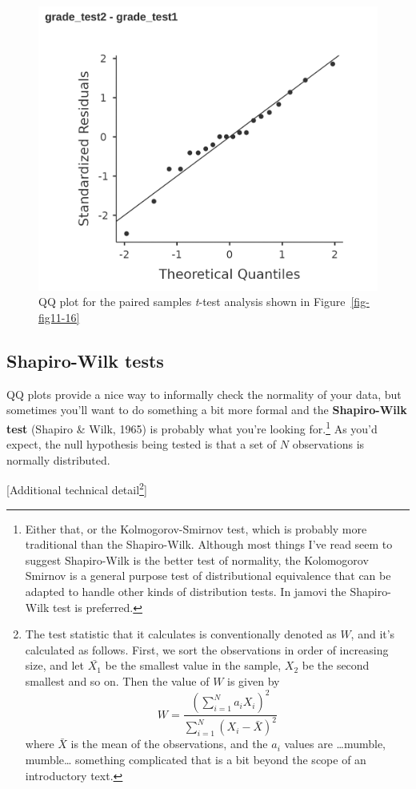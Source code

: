 \documentclass[
  a4paper,
]{book}
\begin{document}
\begin{figure}

\includegraphics[width=1\textwidth,height=\textheight]{images/fig11-23.png} \hfill{}

\caption{\label{fig-fig11-23}QQ plot for the paired samples
\emph{t}-test analysis shown in Figure~\ref{fig-fig11-16}}

\end{figure}

\hypertarget{shapiro-wilk-tests}{%
\subsection{Shapiro-Wilk tests}\label{shapiro-wilk-tests}}

QQ plots provide a nice way to informally check the normality of your
data, but sometimes you'll want to do something a bit more formal and
the \textbf{Shapiro-Wilk test} (Shapiro \& Wilk, 1965) is probably what
you're looking for.\footnote{Either that, or the Kolmogorov-Smirnov
  test, which is probably more traditional than the Shapiro-Wilk.
  Although most things I've read seem to suggest Shapiro-Wilk is the
  better test of normality, the Kolomogorov Smirnov is a general purpose
  test of distributional equivalence that can be adapted to handle other
  kinds of distribution tests. In jamovi the Shapiro-Wilk test is
  preferred.} As you'd expect, the null hypothesis being tested is that
a set of \(N\) observations is normally distributed.

{[}Additional technical detail\footnote{The test statistic that it
  calculates is conventionally denoted as \(W\), and it's calculated as
  follows. First, we sort the observations in order of increasing size,
  and let \(\bar{X_1}\) be the smallest value in the sample, \(X_2\) be
  the second smallest and so on. Then the value of \(W\) is given by
  \[W=\frac{(\sum_{i=1}^N a_iX_i)^2}{\sum_{i=1}^N(X_i-\bar{X})^2}\]
  where \(\bar{X}\) is the mean of the observations, and the \(a_i\)
  values are \ldots mumble, mumble\ldots{} something complicated that is
  a bit beyond the scope of an introductory text.}{]}
\end{document}
